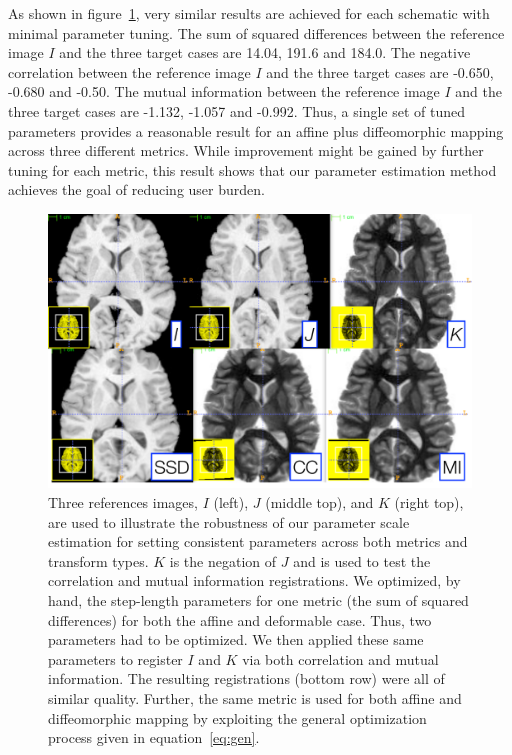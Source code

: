\documentclass{llncs}
\begin{document}
As shown in figure~\ref{fig:result}, very similar results are achieved
for each schematic with minimal parameter tuning.  The sum of squared differences between the reference
image $I$ and the three target cases are 14.04, 191.6 and 184.0.  The negative correlation between the reference
image $I$ and the three target cases are -0.650, -0.680 and -0.50.  The
mutual information between the reference
image $I$ and the three target cases are -1.132, -1.057 and -0.992.
Thus, a single set of tuned parameters provides a reasonable result
for an affine plus diffeomorphic mapping across three different
metrics.  While improvement might be gained by further tuning for each
metric, this result shows that our parameter estimation method
achieves the goal of reducing user burden.  
\begin{figure}[t]
\begin{center}
\includegraphics[width=4.5in]{figs/three.pdf}
\caption{\baselineskip 12pt \small Three references images, $I$
(left), $J$ (middle top), and $K$ (right top), are used to illustrate
the robustness of our parameter scale estimation for setting
consistent parameters across both metrics and transform types.  $K$ is
the negation of $J$ and is used to test the correlation and mutual
information registrations.  We optimized, by hand, the step-length
parameters for one metric (the sum of squared differences) for both the affine
and deformable case.  Thus, two parameters had to be optimized.  We
then applied these same parameters to register $I$ and $K$ via both
correlation and mutual information.  The resulting registrations
(bottom row) were all of similar quality.  Further, the same metric is
used for both affine and diffeomorphic mapping by exploiting the
general optimization process given in equation~\ref{eq:gen}.}
\label{fig:result}
\end{center}
\end{figure}
\end{document}
